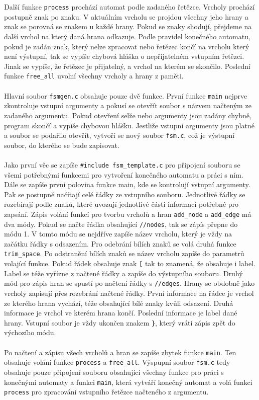 \documentclass[czech,SP]{thesiskiv}
\begin{document}
\\ \\
{Další funkce \texttt{process} prochází automat podle zadaného řetězce. Vrcholy prochází postupně znak po znaku. V aktuálním vrcholu se projdou všechny jeho hrany a znak se porovná se znakem u každé hrany. Pokud se znaky shodují, přejdeme na další vrchol na který daná hrana odkazuje. Podle pravidel konečného automatu, pokud je zadán znak, který nelze zpracovat nebo řetězec končí na vrcholu který není výstupní, tak se vypíše chybová hláška o nepřijatelném vstupním řetězci. Jinak se vypíše, že řetězec je přijatelný, a vrchol na kterém se skončilo. Poslední funkce \texttt{free\_all} uvolní všechny vrcholy a hrany z paměti.}
\\ \\
{Hlavní soubor \texttt{fsmgen.c} obsahuje pouze dvě funkce. První funkce \texttt{main} nejprve zkontroluje vstupní argumenty a pokusí se otevřít soubor s názvem načteným ze zadaného argumentu. Pokud otevření selže nebo argumenty jsou zadány chybně, program skončí a vypíše chybovou hlášku. Jestliže vstupní argumenty jsou platné a soubor se podařilo otevřít, vytvoří se nový soubor \texttt{fsm.c}, což je výstupní soubor, do kterého se bude zapisovat.} 
\\ \\
{Jako první věc se zapíše \texttt{\#include fsm\_template.c} pro připojení souboru se všemi potřebnými funkcemi pro vytvoření konečného automatu a práci s ním. Dále se zapíše první polovina funkce main, kde se kontrolují vstupní argumenty. Pak se postupně načítají celé řádky ze vstupního souboru. Jednotlivé řádky se rozebírají podle znaků, které uvozují jednotlivé části informací potřebné pro zapsání. Zápis volání funkcí pro tvorbu vrcholů a hran \texttt{add\_node} a \texttt{add\_edge} má dva módy. Pokud se načte řádka obsahující \texttt{//nodes}, tak se zápís přepne do módu 1. V tomto módu se nejdříve zapíše název vrcholu, který je vždy na začátku řádky s odsazením. Pro odebrání bílích znaků se volá druhá funkce \texttt{trim\_space}. Po odstranění bílích znaků se název vrcholu zapíše do parametrů volající funkce. Pokud řádek obsahuje znak \texttt{[} tak to znamená, že obsahuje i label. Label se  téže vyřízne z načtené řádky a zapíše do výstupního souboru. Druhý mód pro zápis hran se spustí po načtení řádky s \texttt{//edges}. Hrany se obdobně jako vrcholy zapisují přes rozebrání načtené řádky. První informace na řádce je vrchol ze kterého hrana vychází, téže obsahující bílé znaky kvůli odsazení. Druhá informace je vrchol ve kterém hrana končí. Poslední informace je label dané hrany. Vstupní soubor je vždy ukončen znakem \texttt{\}}, který vrátí zápis zpět do výchozího módu.} 
\\ \\
{Po načtení a zápisu všech vrcholů a hran se zapíše zbytek funkce \texttt{main}. Ten obsahuje volání funkce \texttt{process} a \texttt{free\_all}. Výspupní soubor \texttt{fsm.c} tedy obsahuje pouze připojení souboru obsahující všechny funkce pro práci s konečnými automaty a funkci \texttt{main}, která vytváří konečný automat a volá funkci \texttt{process} pro zpracování vstupního řetězce načteného z argumentu.}
\end{document}
